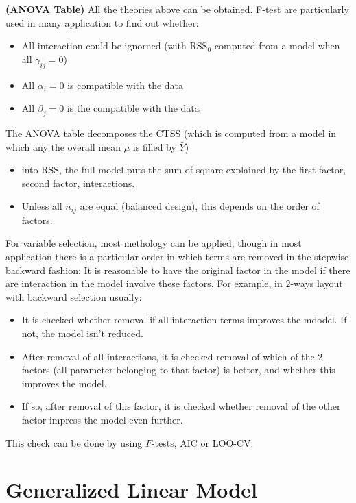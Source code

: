 \begin{remark}{\textbf{(ANOVA Table)}}
    All the theories above can be obtained. F-test are particularly used in many application to find out whether:
    \begin{itemize}
        \item All interaction could be ignorned (with $\text{RSS}_0$ computed from a model when all $\gamma_{ij} = 0$)
        \item All $\alpha_i=0$ is compatible with the data
        \item All $\beta_j = 0$ is the compatible with the data
    \end{itemize}
    The ANOVA table decomposes the $\text{CTSS}$ (which is computed from a model in which any the overall mean $\mu$ is filled by $\bar{Y}$)
    \begin{itemize}
        \item into $\text{RSS}$, the full model puts the sum of square explained by the first factor, second factor, interactions. 
        \item Unless all $n_{ij}$ are equal (balanced design), this depends on the order of factors. 
    \end{itemize}
\end{remark}

\begin{remark}
    For variable selection, most methology can be applied, though in most application there is a particular order in which terms are removed in the stepwise backward fashion: It is reasonable to have the original factor in the model if there are interaction in the model involve these factors. For example, in $2$-ways layout with backward selection usually:
    \begin{itemize}
        \item It is checked whether removal if all interaction terms improves the mdodel. If not, the model isn't reduced. 
        \item After removal of all interactions, it is checked removal of which of the $2$ factors (all parameter belonging to that factor) is better, and whether this improves the model. 
        \item If so, after removal of this factor, it is checked whether removal of the other factor impress the model even further. 
    \end{itemize}
    This check can be done by using $F$-tests, AIC or LOO-CV. 
\end{remark}

\section{Generalized Linear Model}

